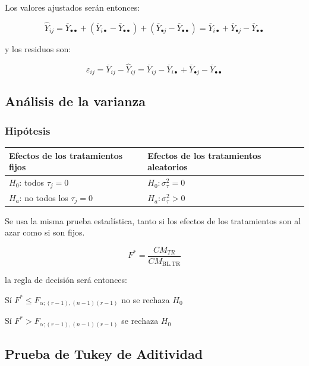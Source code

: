 \documentclass[]{book}
\theoremstyle{definition}
\theoremstyle{definition}
\theoremstyle{definition}
\theoremstyle{remark}
\begin{document}
Los valores ajustados serán entonces:

\[
{\hat{Y}}_{ij}  = \overline{Y}_{\bullet \bullet} + \left( {\overline{Y}}_{i \bullet} - {\overline{Y}}_{\bullet \bullet} \right) + \left( {\overline{Y}}_{\bullet j} - {\overline{Y}}_{\bullet \bullet} \right) = {\overline{Y}}_{i \bullet} + {\overline{Y}}_{\bullet j} - {\overline{Y}}_{\bullet \bullet}
\]

y los residuos son:

\[
\varepsilon_{ij} = {\overline{Y}}_{ij} - {\hat{Y}}_{ij}  = {\overline{Y}}_{ij} - {\overline{Y}}_{i \bullet} + {\overline{Y}}_{\bullet j} - {\overline{Y}}_{\bullet \bullet}
\]

\hypertarget{analisis-de-la-varianza}{%
\subsection{Análisis de la varianza}\label{analisis-de-la-varianza}}

\hypertarget{hipotesis-4}{%
\subsubsection{Hipótesis}\label{hipotesis-4}}

\begin{longtable}[]{@{}ll@{}}
\toprule
Efectos de los tratamientos fijos & Efectos de los tratamientos
aleatorios\tabularnewline
\midrule
\endhead
\(H_{0}\): todos \(\tau_{j} = 0\) &
\(H_{0}:\sigma_{\tau}^{2} = 0\)\tabularnewline
\(H_{a}\): no todos los \(\tau_{j} = 0\) &
\(H_{a}:\sigma_{\tau}^{2} > 0\)\tabularnewline
\bottomrule
\end{longtable}

Se usa la misma prueba estadística, tanto si los efectos de los
tratamientos son al azar como si son fijos.

\[
F^{*} = \frac{CM_{TR}}{CM_{\text{BL.TR}}}
\]

la regla de decisión será entonces:

Sí
\(F^{*} \leq F_{\alpha;\left( r-1 \right),\left( n-1 \right)\left( r-1 \right)}\)
no se rechaza \(H_{0}\)

Sí
\(F^{*} > F_{\alpha;\left( r-1 \right),\left( n-1 \right)\left( r-1 \right)}\)
se rechaza \(H_{0}\)

\hypertarget{prueba-de-tukey-de-aditividad}{%
\subsection{Prueba de Tukey de
Aditividad}\label{prueba-de-tukey-de-aditividad}}
\end{document}
